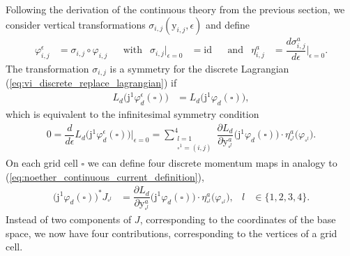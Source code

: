 \documentclass[12pt,a4paper,reqno]{article}
\begin{document}
Following the derivation of the continuous theory from the previous section, we consider vertical transformations $\sigma_{i,j} ({\ensuremath{{\ensuremath{\mathrm{{y}}}}}}_{i,j}, {\ensuremath{\epsilon}})$ and define
\begin{align}\label{eq:noether_discrete_transformation}
{\ensuremath{\varphi}}_{i,j}^{\ensuremath{\epsilon}} &= \sigma_{i,j} \circ {\ensuremath{\varphi}}_{i,j} &
& \text{with} &
\sigma_{i,j} \vert_{{\ensuremath{\epsilon}}=0} &= \mathrm{id} &
& \text{and} &
\eta_{i,j}^{a} &= \dfrac{d \sigma_{i,j}^{a}}{d{\ensuremath{\epsilon}}} \bigg\vert_{{\ensuremath{\epsilon}} = 0} .
\end{align}
The transformation $\sigma_{i,j}$ is a symmetry for the discrete Lagrangian (\ref{eq:vi_discrete_replace_lagrangian}) if
\begin{align}\label{eq:noether_discrete_symmetry_condition_1}
L_{d} \big( {\ensuremath{\mathrm{j}}}^{1} {\ensuremath{\varphi}}^{\ensuremath{\epsilon}}_{d} (\square) \big) &= L_{d} \big( {\ensuremath{\mathrm{j}}}^{1} {\ensuremath{\varphi}}_{d} (\square) \big) ,
\end{align}
which is equivalent to the infinitesimal symmetry condition
\begin{align}\label{eq:noether_discrete_symmetry_condition_2}
0
= \dfrac{d}{d {\ensuremath{\epsilon}}} L_{d} \big( {\ensuremath{\mathrm{j}}}^{1} {\ensuremath{\varphi}}^{\ensuremath{\epsilon}}_{d} (\square) \big) \bigg\vert_{{\ensuremath{\epsilon}} = 0}
= \sum \limits_{\substack{l=1\\ \square^{1} = (i,j)}}^{4} \dfrac{\partial L_{d}}{\partial {\ensuremath{{\ensuremath{\mathrm{{y}}}}}}^{a}_{\square^l}} \big( {\ensuremath{\mathrm{j}}}^{1} {\ensuremath{\varphi}}_{d} (\square) \big) \cdot \eta^{a}_{\square^{l}} \big( {\ensuremath{\varphi}}_{\square^{l}} \big) .
\end{align}
On each grid cell $\square$ we can define four discrete momentum maps in analogy to (\ref{eq:noether_continuous_current_definition}),
\begin{align}\label{eq:noether_discrete_current_abstract}
\big( {\ensuremath{\mathrm{j}}}^{1} {\ensuremath{\varphi}}_{d} (\square) \big)^{*} J_{\square^{l}}
&= \dfrac{\partial L_d}{\partial {\ensuremath{{\ensuremath{\mathrm{{y}}}}}}^{a}_{\square^l}} \big( {\ensuremath{\mathrm{j}}}^{1} {\ensuremath{\varphi}}_{d} (\square) \big) \cdot \eta^{a}_{\square^{l}} \big( {\ensuremath{\varphi}}_{\square^{l}} \big) , &
l &\in \{ 1, 2, 3, 4 \} .
\end{align}
Instead of two components of $J$, corresponding to the coordinates of the base space, we now have four contributions, corresponding to the vertices of a grid cell.
\end{document}
